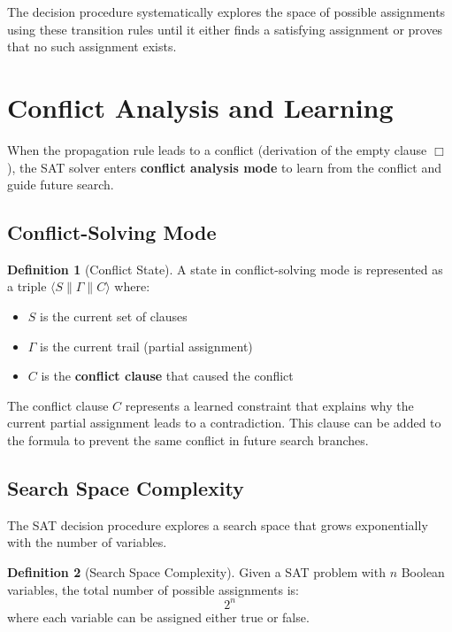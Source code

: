 \documentclass[11pt,a4paper]{article}
\theoremstyle{definition}
\newtheorem{definition}{Definition}[section]
\theoremstyle{plain}
\theoremstyle{remark}
\begin{document}
The decision procedure systematically explores the space of possible assignments using these transition rules until it either finds a satisfying assignment or proves that no such assignment exists.

\section{Conflict Analysis and Learning}

When the propagation rule leads to a conflict (derivation of the empty clause $\Box$), the SAT solver enters \textbf{conflict analysis mode} to learn from the conflict and guide future search.

\subsection{Conflict-Solving Mode}

\begin{tcolorbox}[colback=red!5!white,colframe=red!75!black,title=\textbf{Conflict State Representation}]
\begin{definition}[Conflict State]
A state in conflict-solving mode is represented as a triple $\langle S \parallel \varGamma \parallel C \rangle$ where:
\begin{itemize}
    \item $S$ is the current set of clauses
    \item $\varGamma$ is the current trail (partial assignment)
    \item $C$ is the \textbf{conflict clause} that caused the conflict
\end{itemize}
\end{definition}
\end{tcolorbox}

The conflict clause $C$ represents a learned constraint that explains why the current partial assignment leads to a contradiction. This clause can be added to the formula to prevent the same conflict in future search branches.

\subsection{Search Space Complexity}

The SAT decision procedure explores a search space that grows exponentially with the number of variables.

\begin{tcolorbox}[colback=orange!10!white,colframe=orange!75!black,title=\textbf{Search Space Size}]
\begin{definition}[Search Space Complexity]
Given a SAT problem with $n$ Boolean variables, the total number of possible assignments is:
\[
2^n
\]
where each variable can be assigned either true or false.
\end{definition}
\end{tcolorbox}
\end{document}
